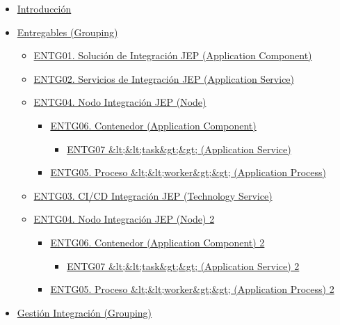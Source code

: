 \documentclass[
  paper=a4,
  ,captions=tableheading
]{scrartcl}
\providecommand{\tightlist}{%
  \setlength{\itemsep}{0pt}\setlength{\parskip}{0pt}}
\begin{document}
\begin{itemize}
\tightlist
\item
  \hyperref[Introducciuxf3n]{Introducción}
\item
  \hyperref[entregables-grouping]{Entregables (Grouping)}

  \begin{itemize}
  \tightlist
  \item
    \hyperref[entg01.-soluciuxf3n-de-integraciuxf3n-jep-application-component]{ENTG01.
    Solución de Integración JEP (Application Component)}
  \item
    \hyperref[entg02.-servicios-de-integraciuxf3n-jep-application-service]{ENTG02.
    Servicios de Integración JEP (Application Service)}
  \item
    \hyperref[entg04.-nodo-integraciuxf3n-jep-node]{ENTG04. Nodo
    Integración JEP (Node)}

    \begin{itemize}
    \tightlist
    \item
      \hyperref[entg06.-contenedor-application-component]{ENTG06.
      Contenedor (Application Component)}

      \begin{itemize}
      \tightlist
      \item
        \hyperref[entg07-ltlttaskgtgt-application-service]{ENTG07
        \&lt;\&lt;task\&gt;\&gt; (Application Service)}
      \end{itemize}
    \item
      \hyperref[entg05.-proceso-ltltworkergtgt-application-process]{ENTG05.
      Proceso \&lt;\&lt;worker\&gt;\&gt; (Application Process)}
    \end{itemize}
  \item
    \hyperref[entg03.-cicd-integraciuxf3n-jep-technology-service]{ENTG03.
    CI/CD Integración JEP (Technology Service)}
  \item
    \hyperref[entg04.-nodo-integraciuxf3n-jep-node-2]{ENTG04. Nodo
    Integración JEP (Node) 2}

    \begin{itemize}
    \tightlist
    \item
      \hyperref[entg06.-contenedor-application-component-2]{ENTG06.
      Contenedor (Application Component) 2}

      \begin{itemize}
      \tightlist
      \item
        \hyperref[entg07-ltlttaskgtgt-application-service-2]{ENTG07
        \&lt;\&lt;task\&gt;\&gt; (Application Service) 2}
      \end{itemize}
    \item
      \hyperref[entg05.-proceso-ltltworkergtgt-application-process-2]{ENTG05.
      Proceso \&lt;\&lt;worker\&gt;\&gt; (Application Process) 2}
    \end{itemize}
  \end{itemize}
\item
  \hyperref[gestiuxf3n-integraciuxf3n-grouping]{Gestión Integración
  (Grouping)}


\end{itemize}
\end{document}

